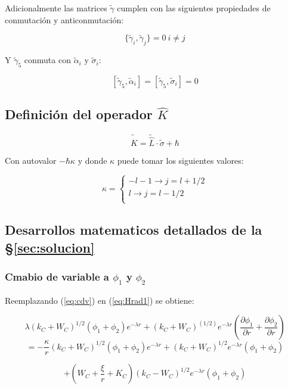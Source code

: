 \documentclass[a4paper, 12pt]{article} %
\begin{document}
Adicionalmente las matrices $\widetilde{\gamma}$ cumplen con las siguientes
propiedades de conmutaci\'on y anticonmutaci\'on:

\[
\{ \widetilde{\gamma}_i, \widetilde{\gamma}_j \} = 0 \ i \neq j
\]

Y $\widetilde{\gamma}_5$ conmuta con $\widetilde{\alpha}_i$ y $\widetilde{\sigma}_i$: 

\[
[\widetilde{\gamma}_5, \widetilde{\alpha}_i] = [\widetilde{\gamma}_5,\widetilde{\sigma}_i] = 0
\]

\subsection{Definici\'on del operador $\hat{K}$}\label{sec:k}

\begin{equation}
\widetilde{\hat{K}} = \widetilde{\hat{L}}\cdot \widetilde{\sigma} + \hbar
\end{equation}

Con autovalor $-\hbar \kappa$ y donde $\kappa$ puede tomar los siguientes
valores:

\[ \kappa = 
\begin{cases}
-l - 1 \rightarrow j = l + 1/2  \\
l \rightarrow j = l - 1/2 \\ 
\end{cases}
\]  


\subsection{Desarrollos matematicos detallados de la \S \ref{sec:solucion}}\label{sec:pasoapaso}

\subsubsection{Cmabio de variable a $\phi_1$ y $\phi_2$}

Reemplazando (\ref{eq:cdv}) en (\ref{eq:Hrad1})  se obtiene:

\[
\lambda (k_C + W_C)^{1/2}(\phi_1 + \phi_2)e^{-\lambda r} + (k_C + W_C)^(1/2)e^{-\lambda r}\left( \dfrac{\partial \phi_1}{\partial r} 
+ \dfrac{\partial \phi_2}{\partial r} \right)
\]
\[
 = - \dfrac{\kappa}{r}  (k_C + W_C)^{1/2}(\phi_1 + \phi_2)e^{-\lambda r} 
+ (k_C + W_C)^{1/2}e^{-\lambda r} (\phi_1 + \phi_2)
\]

\[
+ \left ( W_C + \dfrac{\xi}{r} + K_C \right )(k_C - W_C)^{1/2}e^{-\lambda r}(\phi_1 + \phi_2)
\]
\end{document}

